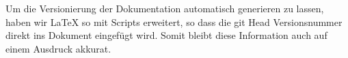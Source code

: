 Um die  Versionierung der Dokumentation automatisch generieren zu lassen, haben wir LaTeX so mit Scripts erweitert, so dass die git Head Versionsnummer
direkt ins Dokument eingefügt wird. Somit bleibt diese Information auch auf einem Ausdruck akkurat.
